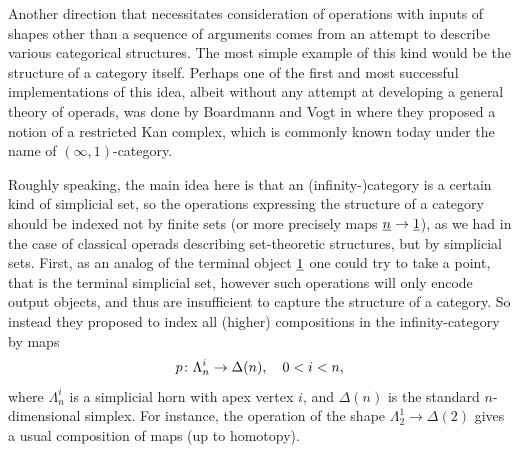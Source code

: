 \documentclass[letterpaper,12pt,leqno]{article}
\numberwithin{equation}{theorem}
\begin{document}
\begin{nparagraph}
Another direction that necessitates consideration of operations with inputs of shapes other than a sequence of arguments comes from an attempt to describe various categorical structures.
The most simple example of this kind would be the structure of a category itself. Perhaps one of the first and most successful implementations of this idea, albeit without any attempt
at developing a general theory of operads, was done by Boardmann and Vogt in \cite{Board-Vogt} where they proposed a notion of a restricted Kan complex, which is commonly known today under
the name of $(\infty, 1)$-category.

Roughly speaking, the main idea here is that an (infinity-)category is a certain kind of simplicial set, so the operations expressing the structure of a category should be indexed
not by finite sets (or more precisely maps $\underline{n} \to \underline{1}$), as we had in the case of classical operads describing set-theoretic structures, but by simplicial sets. First, as an analog
of the terminal object $\underline{1}$ one could try to take a point, that is the terminal simplicial set, however such operations will only encode output objects, and thus are insufficient to capture
the structure of a category. So instead they proposed to index all (higher) compositions in the infinity-category by maps
$$
p\colon \Lambda^i_n \to \Delta(n),\quad 0 < i < n,
$$
where $\Lambda^i_n$ is a simplicial horn with apex vertex $i$, and $\Delta(n)$ is the standard $n$-dimensional simplex. For instance, the operation of the shape $\Lambda^1_2 \to \Delta(2)$
gives a usual composition of maps (up to homotopy).

\end{nparagraph}
\end{document}
